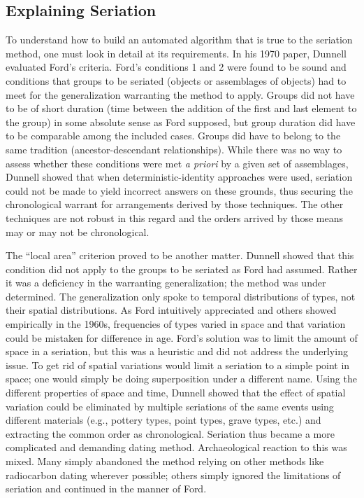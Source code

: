 \documentclass[10pt,letterpaper]{article}
\begin{document}
\subsection*{Explaining Seriation}

To understand how to build an automated algorithm that is true to the seriation method, one must look in detail at its requirements. In his 1970 paper, Dunnell evaluated Ford’s criteria\cite{Dunnell:1970aa,Ford:1938aa,Ford:1962aa}. Ford’s conditions 1 and 2 were found to be sound and conditions that groups to be seriated (objects or assemblages of objects) had to meet for the generalization warranting the method to apply. Groups did not have to be of short duration (time between the addition of the first and last element to the group) in some absolute sense as Ford supposed, but group duration did have to be comparable among the included cases. Groups did have to belong to the same tradition (ancestor-descendant relationships). While there was no way to assess whether these conditions were met \textit{a priori} by a given set of assemblages, Dunnell showed that when deterministic-identity approaches were used, seriation could not be made to yield incorrect answers on these grounds, thus securing the chronological warrant for arrangements derived by those techniques. The other techniques are not robust in this regard and the orders arrived by those means may or may not be chronological.

The “local area” criterion proved to be another matter. Dunnell \cite{Dunnell:1970aa} showed that this condition did not apply to the groups to be seriated as Ford had assumed. Rather it was a deficiency in the warranting generalization; the method was under determined. The generalization only spoke to temporal distributions of types, not their spatial distributions. As Ford intuitively appreciated and others showed empirically in the 1960s, frequencies of types varied in space and that variation could be mistaken for difference in age. Ford’s solution was to limit the amount of space in a seriation, but this was a heuristic and did not address the underlying issue. To get rid of spatial variations would limit a seriation to a simple point in space; one would simply be doing superposition under a different name. Using the different properties of space and time, Dunnell showed that the effect of spatial variation could be eliminated by multiple seriations of the same events using different materials (e.g., pottery types, point types, grave types, etc.) and extracting the common order as chronological. Seriation thus became a more complicated and demanding dating method. Archaeological reaction to this was mixed. Many simply abandoned the method relying on other methods like radiocarbon dating wherever possible; others simply ignored the limitations of seriation and continued in the manner of Ford.
\end{document}
